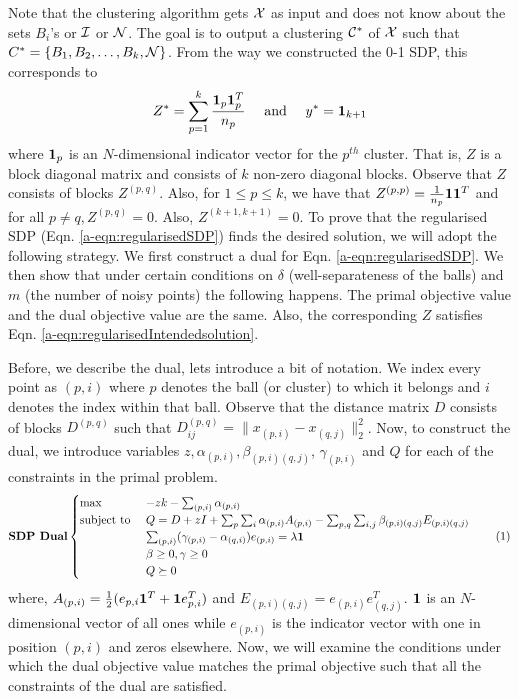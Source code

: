 Note that the clustering algorithm gets $\mathcal X$ as input and does not know about the sets $B_i$'s or $\mathcal I$ or $\mathcal N$. The goal is to output a clustering $\mathcal C^*$ of $\mathcal X$ such that $C^* = \{B_1, B_2, \ldots, B_k, \mathcal N\}$. From the way we constructed the 0-1 SDP, this corresponds to
\begin{align}
  Z^* = \sum_{p=1}^k \frac{\mathbf 1_p \mathbf 1_{p}^T}{n_p} \enspace\enspace\text{ and }\enspace\enspace y^* = \mathbf 1_{k+1}\label{a-eqn:regularisedIntendedsolution}
\end{align}
where $\mathbf 1_p$ is an $N$-dimensional indicator vector for the $p^{th}$ cluster. That is, $Z$ is a block diagonal matrix and consists of $k$ non-zero diagonal blocks. Observe that $Z$ consists of blocks $Z^{(p, q)}$. Also, for $1\le p \le k$, we have that $Z^{(p, p)} = \frac{1}{n_p}\mathbf 1\mathbf 1^T$ and for all $p \neq q, Z^{(p, q)} = 0$. Also, $Z^{(k+1, k+1)} = 0$. To prove that the regularised SDP (Eqn. \ref{a-eqn:regularisedSDP}) finds the desired solution, we  will adopt the following strategy. We first construct a dual for Eqn. \ref{a-eqn:regularisedSDP}. We then show that under certain conditions on $\delta$ (well-separateness of the balls) and $m$ (the number of noisy points) the following happens. The primal objective value and the dual objective value are the same. Also, the corresponding $Z$ satisfies Eqn. \ref{a-eqn:regularisedIntendedsolution}. 

Before, we describe the dual, lets introduce a bit of notation. We index every point as $(p, i)$ where $p$ denotes the ball (or cluster) to which it belongs and $i$ denotes the index within that ball. Observe that the distance matrix $D$ consists of blocks $D^{(p, q)}$ such that $D^{(p,q)}_{ij} = \|x_{(p,i)}-x_{(q,j)}\|^2_2$. Now, to construct the dual, we introduce variables $z, \alpha_{(p,i)}, \beta_{(p,i)(q,j)}$, $\gamma_{(p, i)}$ and $Q$ for each of the constraints in the primal problem. 
\[\textbf{SDP Dual}
    \begin{cases}
		\max \enspace &-zk - \sum_{(p, i)} \alpha_{(p,i)}\\
		\text{subject to } 
		&Q = D + zI + \sum_p\sum_i \alpha_{(p,i)}A_{(p, i)} -\sum_{p,q}\sum_{i,j} \beta_{(p,i)(q,j)}E_{(p,i)(q,j)}\\
		&\sum_{(p,i)} (\gamma_{(p,i)}-\alpha_{(q,i)}) e_{(p, i)} = \lambda \mb 1\\
		&\beta \ge 0, \gamma \ge 0 \\
		&Q \succeq 0
	\end{cases}
	\label{a-eqn:resularisedSDPDual}
	\numberthis
\]
where, $A_{(p,i)} = \frac{1}{2}(e_{p,i}\mathbf 1^T + \mathbf 1 e_{p, i}^T)$ and $E_{(p,i)(q,j)} = e_{(p,i)}e_{(q,j)}^T$. $\mathbf 1$ is an $N$-dimensional vector of all ones while $e_{(p,i)}$ is the indicator vector with one in position $(p, i)$ and zeros elsewhere. Now, we will examine the conditions under which the dual objective value matches the primal objective such that all the constraints of the dual are satisfied. 

